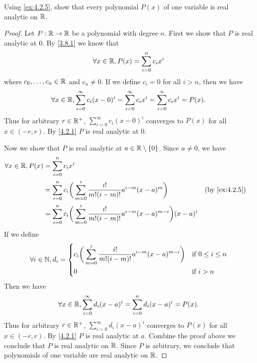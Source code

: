 \begin{ex}\label{ex:4.2.6}
  Using \cref{ex:4.2.5}, show that every polynomial \(P(x)\) of one variable is real analytic on \(\mathbb{R}\).
\end{ex}

\begin{proof}
  Let \(P : \mathbb{R} \to \mathbb{R}\) be a polynomial with degree \(n\).
  First we show that \(P\) is real analytic at \(0\).
  By \cref{3.8.1} we know that
  \[
    \forall x \in \mathbb{R}, P(x) = \sum_{i = 0}^n c_i x^i
  \]
  where \(c_0, \dots, c_n \in \mathbb{R}\) and \(c_n \neq 0\).
  If we define \(c_i = 0\) for all \(i > n\), then we have
  \[
    \forall x \in \mathbb{R}, \sum_{i = 0}^\infty c_i (x - 0)^i = \sum_{i = 0}^\infty c_i x^i = \sum_{i = 0}^n c_i x^i = P(x).
  \]
  Thus for arbitrary \(r \in \mathbb{R}^+\), \(\sum_{i = 0}^\infty c_i (x - 0)^i\) converges to \(P(x)\) for all \(x \in (-r, r)\).
  By \cref{4.2.1} \(P\) is real analytic at \(0\).

  Now we show that \(P\) is real analytic at \(a \in \mathbb{R} \setminus \{0\}\).
  Since \(a \neq 0\), we have
  \begin{align*}
    \forall x \in \R, P(x) & = \sum_{i = 0}^n c_i x^i                                                                                                                     \\
                           & = \sum_{i = 0}^n c_i \bigg(\sum_{m = 0}^i \dfrac{i!}{m! (i - m)!} a^{i - m} (x - a)^m\bigg)                 &  & \text{(by \cref{ex:4.2.5})} \\
                           & = \sum_{i = 0}^n c_i \bigg(\sum_{m = 0}^i \dfrac{i!}{m! (i - m)!} a^{i - m} (x - a)^{m - i}\bigg) (x - a)^i
  \end{align*}
  If we define
  \[
    \forall i \in \mathbb{N}, d_i = \begin{dcases}
      c_i \bigg(\sum_{m = 0}^i \dfrac{i!}{m! (i - m)!} a^{i - m} (x - a)^{m - i}\bigg) & \text{if } 0 \leq i \leq n \\
      0                                                                                & \text{if } i > n
    \end{dcases}
  \]
  Then we have
  \[
    \forall x \in \mathbb{R}, \sum_{i = 0}^\infty d_i (x - a)^i = \sum_{i = 0}^n d_i (x - a)^i = P(x).
  \]
  Thus for arbitrary \(r \in \mathbb{R}^+\), \(\sum_{i = 0}^\infty d_i (x - a)^i\) converges to \(P(x)\) for all \(x \in (-r, r)\).
  By \cref{4.2.1} \(P\) is real analytic at \(a\).
  Combine the proof above we conclude that \(P\) is real analytic on \(\mathbb{R}\).
  Since \(P\) is arbitrary, we conclude that polynomials of one variable are real analytic on \(\mathbb{R}\).
\end{proof}

